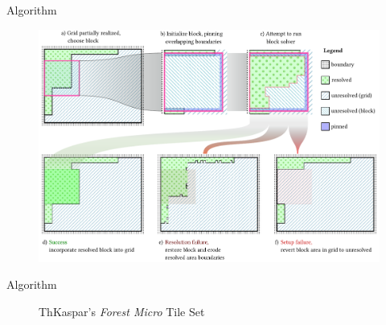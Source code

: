 \documentclass{beamer}
\begin{document}
  \begin{frame}[fragile]{Algorithm}
    \begin{figure}
      \includegraphics[width=\textwidth]{figs/poms_figalg.pdf}
    \end{figure}
  \end{frame}

%

%

  \begin{frame}[fragile]{Algorithm}

    \begin{figure}
      ThKaspar's \textit{Forest Micro} Tile Set

    \end{figure}
  \end{frame}

%
\end{document}
